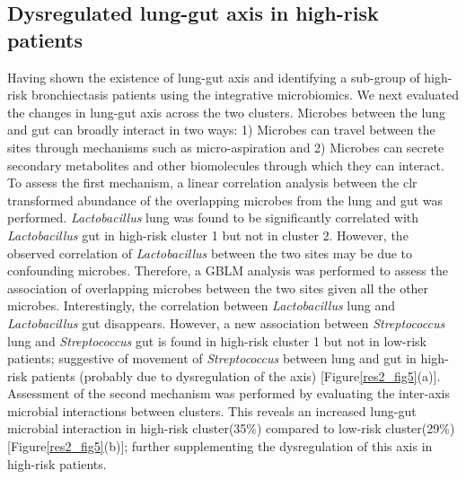 \subsection{Dysregulated lung-gut axis in high-risk patients}
Having shown the existence of lung-gut axis and identifying a sub-group of high-risk bronchiectasis patients using the integrative microbiomics. We next evaluated the changes in lung-gut axis across the two clusters. Microbes between the lung and gut can broadly interact in two ways: 1) Microbes can travel between the sites through mechanisms such as micro-aspiration and 2) Microbes can secrete secondary metabolites and other biomolecules through which they can interact. To assess the first mechanism, a linear correlation analysis between the clr transformed abundance of the overlapping microbes from the lung and gut was performed. \emph{Lactobacillus} lung was found to be significantly correlated with  \emph{Lactobacillus} gut in high-risk cluster 1 but not in cluster 2. However, the observed correlation of \emph{Lactobacillus} between the two sites may be due to confounding microbes. Therefore, a GBLM analysis was performed to assess the association of overlapping microbes between the two sites given all the other microbes. Interestingly, the correlation between \emph{Lactobacillus} lung and \emph{Lactobacillus} gut disappears. However, a new association between \emph{Streptococcus} lung and \emph{Streptococcus} gut is found in high-risk cluster 1 but not in low-risk patients; suggestive of movement of \emph{Streptococcus} between lung and gut in high-risk patients (probably due to dysregulation of the axis) [Figure\ref{res2_fig5}(a)]. Assessment of the second mechanism was performed by evaluating the inter-axis microbial interactions between clusters. This reveals an increased lung-gut microbial interaction in high-risk cluster(35\%) compared to low-risk cluster(29\%) [Figure\ref{res2_fig5}(b)]; further supplementing the dysregulation of this axis in high-risk patients.

